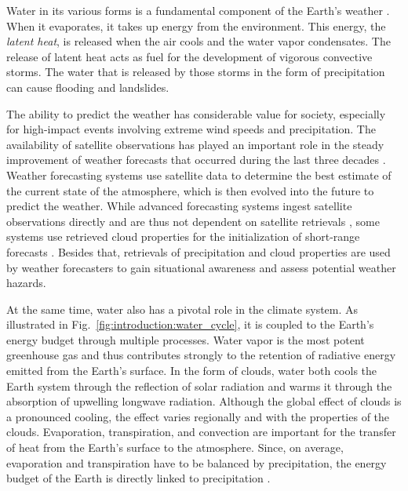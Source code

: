 Water in its various forms is a fundamental component of the Earth's weather
\citep{stevens13}.
When it evaporates, it takes up energy from the environment. This energy, the
\textit{latent heat}, is released when the air cools and the water vapor condensates. The
release of latent heat acts as fuel for the development of vigorous convective
storms. The water that is released by those storms in the form of precipitation
can cause flooding and landslides.

The ability to predict the weather has considerable value for society,
especially for high-impact events involving extreme wind speeds and
precipitation. The availability of satellite observations has played an
important role in the steady improvement of weather forecasts that occurred
during the last three decades
\citep{bauer15}. Weather forecasting systems use satellite data to
determine the best estimate of the current state of the atmosphere, which is then
evolved into the future to predict the weather. While advanced forecasting
systems ingest satellite observations directly and are thus not dependent on
satellite retrievals \citep{bauer10}, some systems use retrieved cloud
properties for the initialization of short-range forecasts
\citep{dehaan14, benjamin21}. Besides that, retrievals of precipitation and
cloud properties are used by weather forecasters to gain situational awareness
and assess potential weather hazards.


At the same time, water also has a pivotal role in the climate system. As
illustrated in Fig.~\ref{fig:introduction:water_cycle}, it is coupled to the
Earth's energy budget through multiple processes. Water vapor is the most potent
greenhouse gas and thus contributes strongly to the retention of radiative
energy emitted from the Earth's surface. In the form of clouds, water both cools
the Earth system through the reflection of solar radiation and warms it through
the absorption of upwelling longwave radiation. Although the global effect of
clouds is a pronounced cooling, the effect varies regionally and with the
properties of the clouds. Evaporation, transpiration, and convection are
important for the transfer of heat from the Earth's surface to the atmosphere.
Since, on average, evaporation and transpiration have to be balanced by
precipitation, the energy budget of the Earth is directly linked to
precipitation \citep{trenberth09}.

